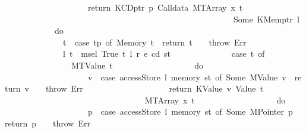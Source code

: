 \begin{isabellebody}
\ \ \ \ \ \ \ \ \ \ \ \ \ \ \ \ \ \ \ \ return\ {\isacharparenleft}{\kern0pt}KCDptr\ p{\isacharcomma}{\kern0pt}\ Calldata\ {\isacharparenleft}{\kern0pt}MTArray\ x\ t{\isacharprime}{\kern0pt}{\isacharprime}{\kern0pt}{\isacharparenright}{\kern0pt}{\isacharparenright}{\kern0pt}\isanewline
\ \ \ \ \ \ \ \ \ \ \ \ \ \ \ \ \ \ {\isacharbraceright}{\kern0pt}\isanewline
\ \ \ \ \ \ \ \ \ \ \ \ \ \ {\isacharparenright}{\kern0pt}\isanewline
\ \ \ \ \ \ \ \ \ \ \ \ {\isacharbraceright}{\kern0pt}\isanewline
\ \ \ \ \ \ \ \ {\isacharbar}{\kern0pt}\ Some\ {\isacharparenleft}{\kern0pt}KMemptr\ l{\isacharprime}{\kern0pt}{\isacharparenright}{\kern0pt}\ {\isasymRightarrow}\isanewline
\ \ \ \ \ \ \ \ \ \ \ \ do\ {\isacharbraceleft}{\kern0pt}\isanewline
\ \ \ \ \ \ \ \ \ \ \ \ \ \ t\ {\isasymleftarrow}\ case\ tp\ of\ Memory\ t\ {\isasymRightarrow}\ return\ t\ {\isacharbar}{\kern0pt}\ {\isacharunderscore}{\kern0pt}\ {\isasymRightarrow}\ throw\ Err{\isacharsemicolon}{\kern0pt}\isanewline
\ \ \ \ \ \ \ \ \ \ \ \ \ \ {\isacharparenleft}{\kern0pt}l{\isacharprime}{\kern0pt}{\isacharprime}{\kern0pt}{\isacharcomma}{\kern0pt}\ t{\isacharprime}{\kern0pt}{\isacharparenright}{\kern0pt}\ {\isasymleftarrow}\ msel\ True\ t\ l{\isacharprime}{\kern0pt}\ r\ e\ cd\ st{\isacharsemicolon}{\kern0pt}\isanewline
\ \ \ \ \ \ \ \ \ \ \ \ \ \ {\isacharparenleft}{\kern0pt}case\ t{\isacharprime}{\kern0pt}\ of\isanewline
\ \ \ \ \ \ \ \ \ \ \ \ \ \ \ \ MTValue\ t{\isacharprime}{\kern0pt}{\isacharprime}{\kern0pt}\ {\isasymRightarrow}\isanewline
\ \ \ \ \ \ \ \ \ \ \ \ \ \ \ \ \ \ do\ {\isacharbraceleft}{\kern0pt}\isanewline
\ \ \ \ \ \ \ \ \ \ \ \ \ \ \ \ \ \ \ \ v\ {\isasymleftarrow}\ case\ accessStore\ l{\isacharprime}{\kern0pt}{\isacharprime}{\kern0pt}\ {\isacharparenleft}{\kern0pt}memory\ st{\isacharparenright}{\kern0pt}\ of\ Some\ {\isacharparenleft}{\kern0pt}MValue\ v{\isacharparenright}{\kern0pt}\ {\isasymRightarrow}\ return\ v\ {\isacharbar}{\kern0pt}\ {\isacharunderscore}{\kern0pt}\ {\isasymRightarrow}\ throw\ Err{\isacharsemicolon}{\kern0pt}\isanewline
\ \ \ \ \ \ \ \ \ \ \ \ \ \ \ \ \ \ \ \ return\ {\isacharparenleft}{\kern0pt}KValue\ v{\isacharcomma}{\kern0pt}\ Value\ t{\isacharprime}{\kern0pt}{\isacharprime}{\kern0pt}{\isacharparenright}{\kern0pt}\isanewline
\ \ \ \ \ \ \ \ \ \ \ \ \ \ \ \ \ \ {\isacharbraceright}{\kern0pt}\isanewline
\ \ \ \ \ \ \ \ \ \ \ \ \ \ {\isacharbar}{\kern0pt}\ MTArray\ x\ t{\isacharprime}{\kern0pt}{\isacharprime}{\kern0pt}\ {\isasymRightarrow}\isanewline
\ \ \ \ \ \ \ \ \ \ \ \ \ \ \ \ \ \ do\ {\isacharbraceleft}{\kern0pt}\isanewline
\ \ \ \ \ \ \ \ \ \ \ \ \ \ \ \ \ \ \ \ p\ {\isasymleftarrow}\ case\ accessStore\ l{\isacharprime}{\kern0pt}{\isacharprime}{\kern0pt}\ {\isacharparenleft}{\kern0pt}memory\ st{\isacharparenright}{\kern0pt}\ of\ Some\ {\isacharparenleft}{\kern0pt}MPointer\ p{\isacharparenright}{\kern0pt}\ {\isasymRightarrow}\ return\ p\ {\isacharbar}{\kern0pt}\ {\isacharunderscore}{\kern0pt}\ {\isasymRightarrow}\ throw\ Err{\isacharsemicolon}{\kern0pt}\isanewline

\end{isabellebody}
